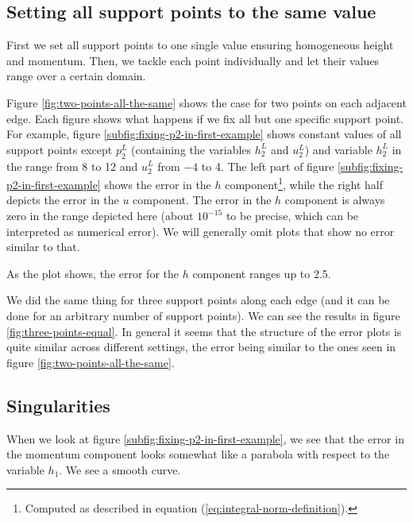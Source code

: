\documentclass[a4paper, twoside]{article}
\begin{document}
\subsection{Setting all support points to the same value}
\label{sec:setting-all-support-points-to-the-same-value}

First we set all support points to one single value ensuring homogeneous height and momentum. Then, we tackle each point individually and let their values range over a certain domain.



Figure \ref{fig:two-points-all-the-same} shows the case for two points on each adjacent edge. Each figure shows what happens if we fix all but one specific support point. For example, figure \ref{subfig:fixing-p2-in-first-example} shows constant values of all support points except $p_2^L$ (containing the variables $h_2^L$ and $u_2^L$) and variable $h_2^L$ in the range from 8 to 12 and $u_2^L$ from $-4$ to 4.
The left part of figure \ref{subfig:fixing-p2-in-first-example} shows the error in the $h$ component\footnote{Computed as described in equation (\ref{eq:integral-norm-definition}).}, while the right half depicts the error in the $u$ component.
The error in the $h$ component is always zero in the range depicted here (about $10^{-15}$ to be precise, which can be interpreted as numerical error). We will generally omit plots that show no error similar to that.

As the plot shows, the error for the $h$ component ranges up to 2.5.

We did the same thing for three support points along each edge (and it can be done for an arbitrary number of support points). We can see the results in figure \ref{fig:three-points-equal}. In general it seems that the structure of the error plots is quite similar across different settings, the error being similar to the ones seen in figure \ref{fig:two-points-all-the-same}.



\subsection{Singularities}
\label{sec:plots-discontinuities}

When we look at figure \ref{subfig:fixing-p2-in-first-example}, we see that the error in the momentum component looks somewhat like a parabola with respect to the variable $h_1$. We see a smooth curve.
\end{document}
